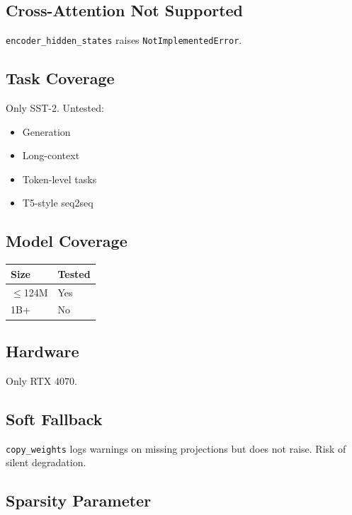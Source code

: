 \subsection{Cross-Attention Not Supported}

\texttt{encoder\_hidden\_states} raises \texttt{NotImplementedError}.

\subsection{Task Coverage}

Only SST-2. Untested:
\begin{itemize}
\item Generation
\item Long-context
\item Token-level tasks
\item T5-style seq2seq

\end{itemize}
\subsection{Model Coverage}

\begin{table}[H]
\centering
\small
\begin{tabular}{ll}
\toprule
\textbf{Size} & \textbf{Tested} \\
\midrule
$\le$124M & Yes \\
1B+ & No \\
\bottomrule
\end{tabular}
\end{table}

\subsection{Hardware}

Only RTX 4070.

\subsection{Soft Fallback}

\texttt{copy\_weights} logs warnings on missing projections but does not raise. 
Risk of silent degradation.

\subsection{Sparsity Parameter}


